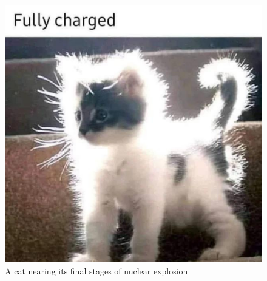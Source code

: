 \documentclass{article}
\begin{document}
        \begin{figure}
            \centering
            \includegraphics[width=0.5\linewidth]{kitkuuuuuu2.png}
            \caption{A cat nearing its final stages of nuclear explosion \cite{knuth:1984}}
            \label{fig:enter-label}
        \end{figure}

    \clearpage
    
        
\end{document}
